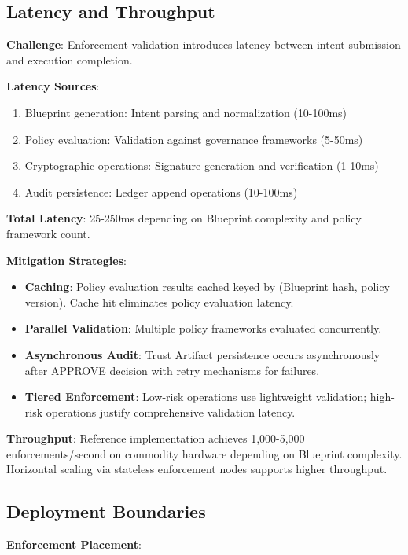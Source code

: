 \documentclass[11pt,letterpaper]{article}
\begin{document}
\subsection{Latency and Throughput}

\textbf{Challenge}: Enforcement validation introduces latency between intent submission and execution completion.

\textbf{Latency Sources}:
\begin{enumerate}
\item Blueprint generation: Intent parsing and normalization (10-100ms)
\item Policy evaluation: Validation against governance frameworks (5-50ms)
\item Cryptographic operations: Signature generation and verification (1-10ms)
\item Audit persistence: Ledger append operations (10-100ms)
\end{enumerate}

\textbf{Total Latency}: 25-250ms depending on Blueprint complexity and policy framework count.

\textbf{Mitigation Strategies}:

\begin{itemize}
\item \textbf{Caching}: Policy evaluation results cached keyed by (Blueprint hash, policy version). Cache hit eliminates policy evaluation latency.
\item \textbf{Parallel Validation}: Multiple policy frameworks evaluated concurrently.
\item \textbf{Asynchronous Audit}: Trust Artifact persistence occurs asynchronously after APPROVE decision with retry mechanisms for failures.
\item \textbf{Tiered Enforcement}: Low-risk operations use lightweight validation; high-risk operations justify comprehensive validation latency.
\end{itemize}

\textbf{Throughput}: Reference implementation achieves 1,000-5,000 enforcements/second on commodity hardware depending on Blueprint complexity. Horizontal scaling via stateless enforcement nodes supports higher throughput.

\subsection{Deployment Boundaries}

\textbf{Enforcement Placement}:
\end{document}
